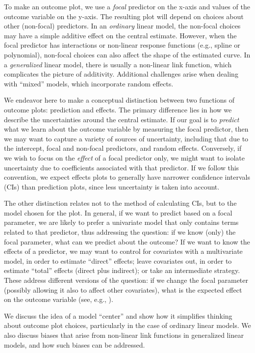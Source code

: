 To make an outcome plot, we use a \emph{focal} predictor on the x-axis and values of the outcome variable on the y-axis. The resulting plot will depend on choices about other (non-focal) predictors. In an \emph{ordinary} linear model, the non-focal choices may have a simple additive effect on the central estimate. However, when the focal predictor has interactions or non-linear response functions (e.g., spline or polynomial), non-focal choices can also affect the shape of the estimated curve. 
In a \emph{generalized} linear model, there is usually a non-linear link function, which complicates the picture of additivity.
Additional challenges arise when dealing with “mixed” models, which incorporate random effects.

We endeavor here to make a conceptual distinction between two functions of 
outcome plots: prediction and effects. 
The primary difference lies in how we describe the uncertainties around the central estimate. 
If our goal is to \emph{predict} what we learn about the outcome variable by measuring the focal predictor, then we may want to capture a variety of sources of uncertainty, including that due to the intercept, focal and non-focal predictors, and random effects.
Conversely, if we wish to focus on the \emph{effect} of a focal predictor only, we might want to isolate uncertainty due to coefficients associated with that predictor.
If we follow this convention, we expect effects plots to generally have narrower confidence intervals (CIs) than prediction plots, since less uncertainty is taken into account.

The other distinction relates not to the method of calculating CIs, but to the model chosen for the plot. 
In general, if we want to predict based on a focal parameter, we are likely to prefer a univariate model that only contains terms related to that predictor, thus addressing the question: if we know (only) the focal parameter, what can we predict about the outcome?
If we want to know the effects of a predictor, we may want to control for covariates with a multivariate model, in order to estimate “direct” effects; leave covariates out, in order to estimate “total” effects (direct plus indirect); or take an intermediate strategy.
These address different versions of the question: if we change the focal parameter (possibly allowing it also to affect other covariates), what is the expected effect on the outcome variable (see, e.g., \citep{shi_evidence_2017}).

We discuss the idea of a model “center” and show how it simplifies thinking about outcome plot choices, particularly in the case of ordinary linear models. We also discuss biases that arise from non-linear link functions in generalized linear models, and how such biases can be addressed.


